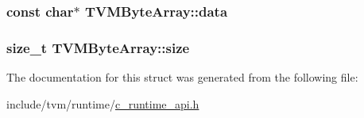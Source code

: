 \subsubsection[{\texorpdfstring{data}{data}}]{\setlength{\rightskip}{0pt plus 5cm}const char$\ast$ T\+V\+M\+Byte\+Array\+::data}\hypertarget{structTVMByteArray_ab124e3227a75e0e4d55452f675f4fde1}{}\label{structTVMByteArray_ab124e3227a75e0e4d55452f675f4fde1}
\subsubsection[{\texorpdfstring{size}{size}}]{\setlength{\rightskip}{0pt plus 5cm}size\+\_\+t T\+V\+M\+Byte\+Array\+::size}\hypertarget{structTVMByteArray_a86d8e8341ce407b7d9374d887143e476}{}\label{structTVMByteArray_a86d8e8341ce407b7d9374d887143e476}


The documentation for this struct was generated from the following file\+:\begin{DoxyCompactItemize}
\item 
include/tvm/runtime/\hyperlink{c__runtime__api_8h}{c\+\_\+runtime\+\_\+api.\+h}\end{DoxyCompactItemize}
